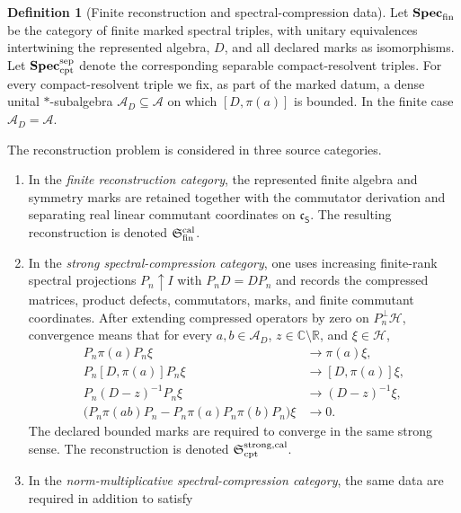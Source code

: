 \documentclass[11pt]{article}
\theoremstyle{definition}
\newtheorem{definition}[definition]{Definition}
\theoremstyle{remark}
\theoremstyle{definition}
\theoremstyle{remark}
\newcommand{\A}{\mathcal A}
\newcommand{\Hh}{\mathcal H}
\begin{document}
\begin{definition}[Finite reconstruction and spectral-compression data]
\label{def:reconstruction-categories}
Let $\mathbf{Spec}_{\rm fin}$ be the category of finite marked spectral triples,
with unitary equivalences intertwining the represented algebra, $D$, and all
declared marks as isomorphisms.  Let $\mathbf{Spec}_{\rm cpt}^{\rm sep}$ denote
the corresponding separable compact-resolvent triples.  For every compact-resolvent triple
we fix, as part of the marked datum, a dense unital $*$-subalgebra
$\A_D\subseteq\A$ on which $[D,\pi(a)]$ is bounded.  In the finite case
$\A_D=\A$.

The reconstruction problem is considered in three source categories.
\begin{enumerate}[label=\textup{(C\arabic*)},leftmargin=3em]
\item In the \emph{finite reconstruction category}, the represented finite algebra and
      symmetry marks are retained together with the commutator derivation and
      separating real linear commutant coordinates on $\mathfrak c_{\mathsf S}$.
      The resulting reconstruction is denoted $\mathfrak S_{\rm fin}^{\rm cal}$.
\item In the \emph{strong spectral-compression category}, one uses increasing
      finite-rank spectral projections $P_n\uparrow I$ with $P_nD=DP_n$ and records
      the compressed matrices, product defects, commutators, marks, and finite
      commutant coordinates.  After extending compressed operators by zero on
      $P_n^\perp\Hh$, convergence means that for every $a,b\in\A_D$,
      $z\in\mathbb C\setminus\mathbb R$, and $\xi\in\Hh$,
      \begin{align}
      P_n\pi(a)P_n\xi&\longrightarrow\pi(a)\xi,\nonumber\\
      P_n[D,\pi(a)]P_n\xi&\longrightarrow[D,\pi(a)]\xi,\nonumber\\
      P_n(D-z)^{-1}P_n\xi&\longrightarrow(D-z)^{-1}\xi,\nonumber\\
      \bigl(P_n\pi(ab)P_n-P_n\pi(a)P_n\pi(b)P_n\bigr)\xi&\longrightarrow0.
      \label{eq:strong-compression-topology}
      \end{align}
      The declared bounded marks are required to converge in the same strong sense.
      The reconstruction is denoted $\mathfrak S_{\rm cpt}^{\rm strong,cal}$.
\item In the \emph{norm-multiplicative spectral-compression category}, the same
      data are required in addition to satisfy
      \begin{equation}

\end{equation}
\end{enumerate}
\end{definition}
\end{document}
